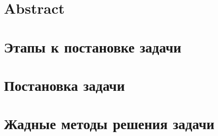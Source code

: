\documentclass[12pt,twoside]{article}
\begin{document}
\section*{\centering Abstract}


\tableofcontents
\newpage

\section{Этапы к постановке задачи}


\section{Постановка задачи}


\section{Жадные методы решения задачи}


\printbibliography
\end{document}
